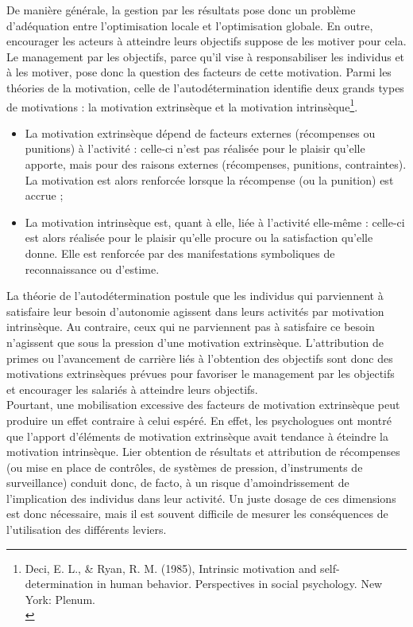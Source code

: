 \documentclass{tufte-handout}
\begin{document}
\begin{enumerate}
De manière générale, la gestion par les résultats pose donc un problème d’adéquation entre l’optimisation locale et l’optimisation globale. En outre, encourager les acteurs à atteindre leurs objectifs suppose de les motiver pour cela. Le management par les objectifs, parce qu’il vise à responsabiliser les individus et à les motiver, pose donc la question des facteurs de cette motivation. Parmi les théories de la motivation, celle de l’autodétermination identifie deux grands types de motivations : la motivation extrinsèque et la motivation intrinsèque\footnote{Deci, E. L., \& Ryan, R. M. (1985), Intrinsic motivation and self-determination in human behavior. Perspectives in social psychology. New York: Plenum.\\}.\\
\begin{itemize}
\item La motivation extrinsèque dépend de facteurs externes (récompenses ou punitions) à l’activité : celle-ci n’est pas réalisée pour le plaisir qu’elle apporte, mais pour des raisons externes (récompenses, punitions, contraintes). La motivation est alors renforcée lorsque la récompense (ou la punition) est accrue ;\\
\item La motivation intrinsèque est, quant à elle, liée à l’activité elle-même : celle-ci est alors réalisée pour le plaisir qu’elle procure ou la satisfaction qu’elle donne. Elle est renforcée par des manifestations symboliques de reconnaissance ou d’estime.\\
\end{itemize}

La théorie de l’autodétermination postule que les individus qui parviennent à satisfaire leur besoin d’autonomie agissent dans leurs activités par motivation intrinsèque. Au contraire, ceux qui ne parviennent pas à satisfaire ce besoin n’agissent que sous la pression d’une motivation extrinsèque. L’attribution de primes ou l’avancement de carrière liés à l’obtention des objectifs sont donc des motivations extrinsèques prévues pour favoriser le management par les objectifs et encourager les salariés à atteindre leurs objectifs.\\

Pourtant, une mobilisation excessive des facteurs de motivation extrinsèque peut produire un effet contraire à celui espéré. En effet, les psychologues ont montré que l’apport d’éléments de motivation extrinsèque avait tendance à éteindre la motivation intrinsèque. Lier obtention de résultats et attribution de récompenses (ou mise en place de contrôles, de systèmes de pression, d’instruments de surveillance) conduit donc, de facto, à un risque d’amoindrissement de l’implication des individus dans leur activité. Un juste dosage de ces dimensions est donc nécessaire, mais il est souvent difficile de mesurer les conséquences de l’utilisation des différents leviers.\\


\end{enumerate}
\end{document}
